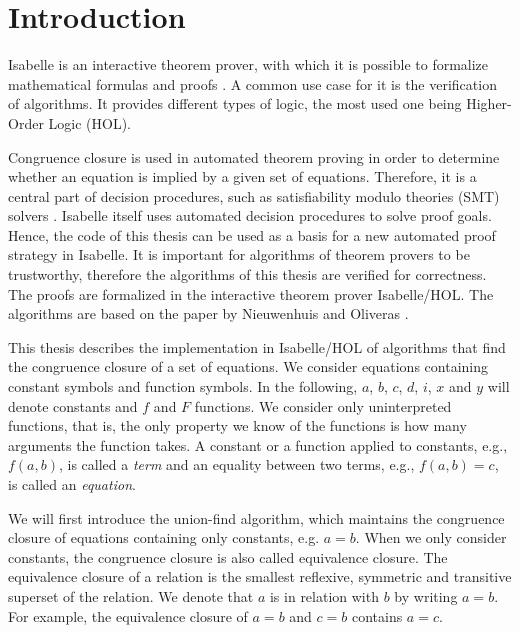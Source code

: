 
\chapter{Introduction}\label{chapter:introduction}

Isabelle is an interactive theorem prover, with which it is possible to formalize mathematical formulas and proofs \cite{isabelle}. A common use case for it is the verification of algorithms.
It provides different types of logic, the most used one being Higher-Order Logic (HOL).

Congruence closure is used in automated theorem proving in order to determine whether an equation is implied by a given set of equations.
Therefore, it is a central part of decision procedures, such as satisfiability modulo theories (SMT) solvers \cite{z3}.
Isabelle itself uses automated decision procedures to solve proof goals.
Hence, the code of this thesis can be used as a basis for a new automated proof strategy in Isabelle.
It is important for algorithms of theorem provers to be trustworthy, therefore the algorithms of this thesis are verified for correctness.
The proofs are formalized in the interactive theorem prover Isabelle/HOL.
The algorithms are based on the paper by Nieuwenhuis and Oliveras \cite{Nieuwenhuis}.

This thesis describes the implementation in Isabelle/HOL of algorithms that find the congruence closure of a set of equations. We consider equations containing constant symbols and function symbols. In the following, $a$, $b$, $c$, $d$, $i$, $x$ and $y$ will denote constants and $f$ and $F$ functions.
We consider only uninterpreted functions, that is, the only property we know of the functions is how many arguments the function takes.
A constant or a function applied to constants, e.g., $f(a, b)$, is called a \emph{term} and an equality between two terms, e.g., $f(a, b) = c$, is called an \emph{equation}.

We will first introduce the union-find algorithm, which maintains the congruence closure of equations containing only constants, e.g. $a = b$. When we only consider constants, the congruence closure is also called equivalence closure. The equivalence closure of a relation is the smallest reflexive, symmetric and transitive superset of the relation. We denote that $a$ is in relation with $b$ by writing $a = b$. For example, the equivalence closure of $a = b$ and $c = b$ contains $a = c$.

